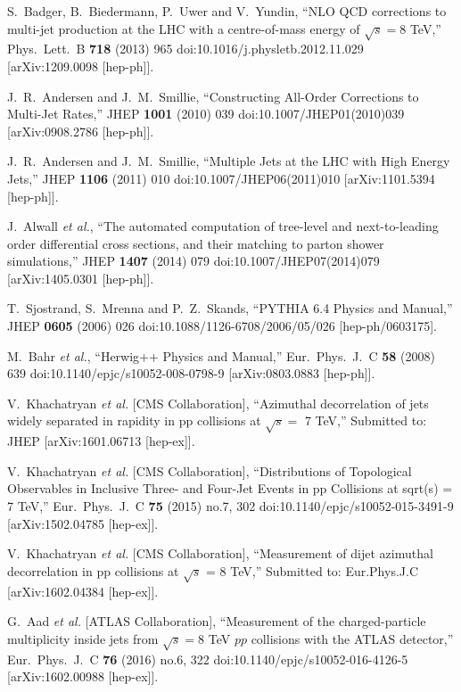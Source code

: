 \documentclass{PoS}
\begin{document}
\begin{thebibliography}{99}
  S.~Badger, B.~Biedermann, P.~Uwer and V.~Yundin,
  ``NLO QCD corrections to multi-jet production at the LHC with a centre-of-mass energy of $\sqrt{s}=8$ TeV,''
  Phys.\ Lett.\ B {\bf 718} (2013) 965
  doi:10.1016/j.physletb.2012.11.029
  [arXiv:1209.0098 [hep-ph]].

  J.~R.~Andersen and J.~M.~Smillie,
  ``Constructing All-Order Corrections to Multi-Jet Rates,''
  JHEP {\bf 1001} (2010) 039
  doi:10.1007/JHEP01(2010)039
  [arXiv:0908.2786 [hep-ph]].

  J.~R.~Andersen and J.~M.~Smillie,
  ``Multiple Jets at the LHC with High Energy Jets,''
  JHEP {\bf 1106} (2011) 010
  doi:10.1007/JHEP06(2011)010
  [arXiv:1101.5394 [hep-ph]].

  J.~Alwall {\it et al.},
  ``The automated computation of tree-level and next-to-leading order differential cross sections, and their matching to parton shower simulations,''
  JHEP {\bf 1407} (2014) 079
  doi:10.1007/JHEP07(2014)079
  [arXiv:1405.0301 [hep-ph]].

  T.~Sjostrand, S.~Mrenna and P.~Z.~Skands,
  ``PYTHIA 6.4 Physics and Manual,''
  JHEP {\bf 0605} (2006) 026
  doi:10.1088/1126-6708/2006/05/026
  [hep-ph/0603175].

  M.~Bahr {\it et al.},
  ``Herwig++ Physics and Manual,''
  Eur.\ Phys.\ J.\ C {\bf 58} (2008) 639
  doi:10.1140/epjc/s10052-008-0798-9
  [arXiv:0803.0883 [hep-ph]].

  V.~Khachatryan {\it et al.} [CMS Collaboration],
  ``Azimuthal decorrelation of jets widely separated in rapidity in pp collisions at $\sqrt{s} =$ 7 TeV,''
  Submitted to: JHEP
  [arXiv:1601.06713 [hep-ex]].

  V.~Khachatryan {\it et al.} [CMS Collaboration],
  ``Distributions of Topological Observables in Inclusive Three- and Four-Jet Events in pp Collisions at sqrt(s) = 7 TeV,''
  Eur.\ Phys.\ J.\ C {\bf 75} (2015) no.7,  302
  doi:10.1140/epjc/s10052-015-3491-9
  [arXiv:1502.04785 [hep-ex]].

  V.~Khachatryan {\it et al.} [CMS Collaboration],
  ``Measurement of dijet azimuthal decorrelation in pp collisions at $\sqrt{s}$ = 8 TeV,''
  Submitted to: Eur.Phys.J.C
  [arXiv:1602.04384 [hep-ex]].

  G.~Aad {\it et al.} [ATLAS Collaboration],
  ``Measurement of the charged-particle multiplicity inside jets from $\sqrt{s}=8$ TeV $pp$ collisions with the ATLAS detector,''
  Eur.\ Phys.\ J.\ C {\bf 76} (2016) no.6,  322
  doi:10.1140/epjc/s10052-016-4126-5
  [arXiv:1602.00988 [hep-ex]].


\end{thebibliography}
\end{document}

